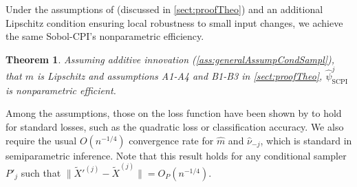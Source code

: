 \documentclass{article}
\theoremstyle{plain}
\newtheorem{theorem}{Theorem}[section]
\theoremstyle{definition}
\theoremstyle{remark}
\begin{document}

Under the assumptions of \citet{williamson2023general} (discussed in \cref{sect:proofTheo}) and an additional Lipschitz condition ensuring local robustness to small input changes, we achieve the same Sobol-CPI's nonparametric efficiency.

\begin{theorem}\label{th:asymp_eff}
Assuming additive innovation (\ref{ass:generalAssumpCondSampl}), that $m$ is Lipschitz and assumptions A1-A4 and B1-B3 in \cref{sect:proofTheo},  $\widehat{\psi}_\mathrm{SCPI}^j$ is nonparametric efficient.
\end{theorem}


Among the assumptions, those on the loss function have been shown by \citet{williamson2023general} to hold for standard losses, such as the quadratic loss or classification accuracy. We also require the usual $O(n^{-1/4})$ convergence rate for $\widehat{m}$ and $\widehat{\nu}_{-j}$, which is standard in semiparametric inference. Note that this result holds for any conditional sampler $P'_j$ such that $\|\widetilde{X}'^{(j)}-\widetilde{X}^{(j)}\|=O_P(n^{-1/4})$. %



%
%
\end{document}
